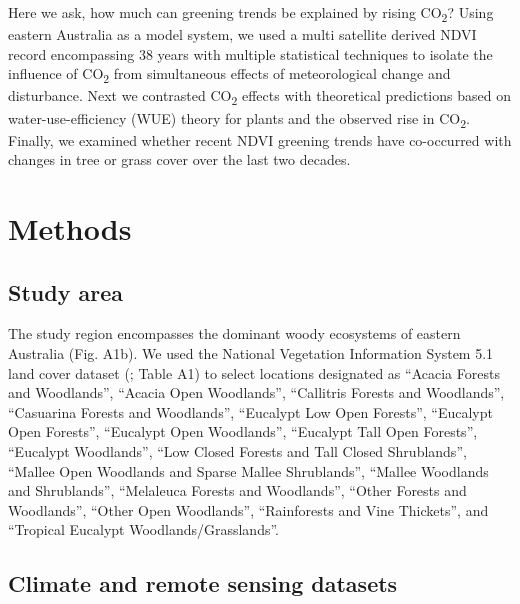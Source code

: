 \documentclass[gc, manuscript]{copernicus}
\begin{document}
Here we ask, how much can greening trends be explained by rising
CO\textsubscript{2}? Using eastern Australia as a model system, we used
a multi satellite derived NDVI record encompassing 38 years with
multiple statistical techniques to isolate the influence of
CO\textsubscript{2} from simultaneous effects of meteorological change
and disturbance. Next we contrasted CO\textsubscript{2} effects with
theoretical predictions based on water-use-efficiency (WUE) theory for
plants and the observed rise in CO\textsubscript{2}. Finally, we
examined whether recent NDVI greening trends have co-occurred with
changes in tree or grass cover over the last two decades.

\section{Methods}

\subsection{Study area}

The study region encompasses the dominant woody ecosystems of eastern
Australia (Fig. A1b). We used the National Vegetation Information System
5.1 land cover dataset (\citet{DepartmentAgricultureWater}; Table A1) to
select locations designated as ``Acacia Forests and Woodlands'',
``Acacia Open Woodlands'', ``Callitris Forests and Woodlands'',
``Casuarina Forests and Woodlands'', ``Eucalypt Low Open Forests'',
``Eucalypt Open Forests'', ``Eucalypt Open Woodlands'', ``Eucalypt Tall
Open Forests'', ``Eucalypt Woodlands'', ``Low Closed Forests and Tall
Closed Shrublands'', ``Mallee Open Woodlands and Sparse Mallee
Shrublands'', ``Mallee Woodlands and Shrublands'', ``Melaleuca Forests
and Woodlands'', ``Other Forests and Woodlands'', ``Other Open
Woodlands'', ``Rainforests and Vine Thickets'', and ``Tropical Eucalypt
Woodlands/Grasslands''.

\subsection{Climate and remote sensing datasets}
\end{document}
